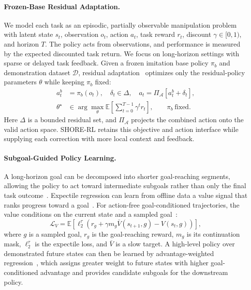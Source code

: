 \documentclass[letterpaper]{article} %
\begin{document}
\paragraph{Frozen-Base Residual Adaptation.}
We model each task as an episodic, partially observable manipulation problem
with latent state $s_t$, observation $o_t$, action $a_t$, task reward $r_t$, discount
$\gamma\in[0,1)$, and horizon $T$. The policy acts from observations, and
performance is measured by the expected discounted task return. We focus on
long-horizon settings with sparse or delayed task feedback. Given a frozen
imitation base policy $\pi_b$ and demonstration dataset $\mathcal D$, residual
adaptation~\cite{johannink2019residual,resfit2025residual} optimizes only the
residual-policy parameters $\theta$ while keeping $\pi_b$ fixed:
\begin{equation}
\begin{aligned}
a_t^b&=\pi_b(o_t),\quad \delta_t\in\Delta,\quad
a_t=\Pi_{\mathcal A}[a_t^b+\delta_t],\\
\theta^\star&\in\arg\max_\theta
\mathbb E\!\left[\sum_{t=0}^{T-1}\gamma^t r_t\right],
\qquad \pi_b\ \text{fixed}.
\end{aligned}
\label{eq:frozen-base-residual-adaptation}
\end{equation}
Here $\Delta$ is a bounded residual set, and $\Pi_{\mathcal A}$ projects the
combined action onto the valid action space. SHORE-RL retains this objective
and action interface while supplying each correction with more local context
and feedback.

\paragraph{Subgoal-Guided Policy Learning.}
A long-horizon goal can be decomposed into shorter goal-reaching segments,
allowing the policy to act toward intermediate subgoals rather than only the
final task outcome~\cite{sutton1999between,nachum2018hiro}. Expectile
regression can learn from offline data a value signal that ranks progress
toward a goal~\cite{kostrikov2022iql}. For action-free goal-conditioned
trajectories, the value conditions on the current state and a sampled
goal~\cite{park2023hiql}:
\begin{equation}
\mathcal L_V
=
\mathbb E\!\left[
\ell_2^\tau\!\left(
 r_g+\gamma m_g\bar V(s_{t+1},g)-V(s_t,g)
\right)\right],
\label{eq:goal-value-background}
\end{equation}
where $g$ is a sampled goal, $r_g$ is the goal-reaching reward, $m_g$ is its
continuation mask, $\ell_2^\tau$ is the expectile loss, and $\bar V$ is a
slow target. A high-level policy over demonstrated future states can then be
learned by advantage-weighted regression~\cite{peng2019awr,park2023hiql},
which assigns greater weight to future states with higher goal-conditioned
advantage and provides candidate subgoals for the downstream policy.
\end{document}

